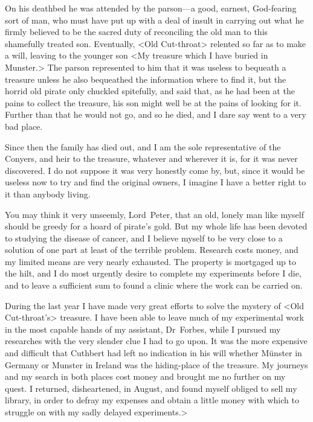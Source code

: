 On his deathbed he was attended by the parson—a good, earnest, God-fearing sort of man, who must have put up with a deal of insult in carrying out what he firmly believed to be the sacred duty of reconciling the old man to this shamefully treated son. Eventually, <Old Cut-throat> relented so far as to make a will, leaving to the younger son <My treasure which I have buried in Munster.> The parson represented to him that it was useless to bequeath a treasure unless he also bequeathed the information where to find it, but the horrid old pirate only chuckled spitefully, and said that, as he had been at the pains to collect the treasure, his son might well be at the pains of looking for it. Further than that he would not go, and so he died, and I dare say went to a very bad place.

Since then the family has died out, and I am the sole representative of the Conyers, and heir to the treasure, whatever and wherever it is, for it was never discovered. I do not suppose it was very honestly come by, but, since it would be useless now to try and find the original owners, I imagine I have a better right to it than anybody living.

You may think it very unseemly, Lord~Peter, that an old, lonely man like myself should be greedy for a hoard of pirate's gold. But my whole life has been devoted to studying the disease of cancer, and I believe myself to be very close to a solution of one part at least of the terrible problem. Research costs money, and my limited means are very nearly exhausted. The property is mortgaged up to the hilt, and I do most urgently desire to complete my experiments before I die, and to leave a sufficient sum to found a clinic where the work can be carried on.

During the last year I have made very great efforts to solve the mystery of <Old Cut-throat's> treasure. I have been able to leave much of my experimental work in the most capable hands of my assistant, Dr~Forbes, while I pursued my researches with the very slender clue I had to go upon. It was the more expensive and difficult that Cuthbert had left no indication in his will whether Münster in Germany or Munster in Ireland was the hiding-place of the treasure. My journeys and my search in both places cost money and brought me no further on my quest. I returned, disheartened, in August, and found myself obliged to sell my library, in order to defray my expenses and obtain a little money with which to struggle on with my sadly delayed experiments.>

